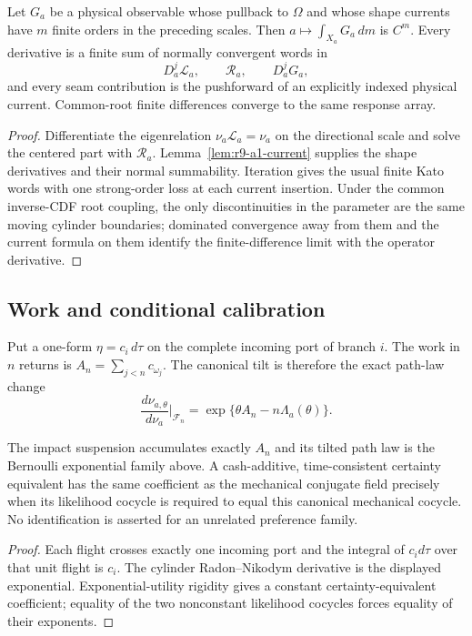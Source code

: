 \begin{theorem}
\label{thm:r9-a1-response}
Let $G_a$ be a physical observable whose pullback to $\Omega$ and whose shape
currents have $m$ finite orders in the preceding scales.  Then
$a\mapsto\int_{X_a}G_a\,dm$ is $C^m$.  Every derivative is a finite sum of
normally convergent words in
\[
 D_a^j\mathcal L_a,
 \qquad \mathcal R_a,
 \qquad D_a^jG_a,
\]
and every seam contribution is the pushforward of an explicitly indexed
physical current.  Common-root finite differences converge to the same
response array.
\end{theorem}

\begin{proof}
Differentiate the eigenrelation
$\nu_a\mathcal L_a=\nu_a$ on the directional scale and solve the centered
part with $\mathcal R_a$.  Lemma~\ref{lem:r9-a1-current} supplies the shape
derivatives and their normal summability.  Iteration gives the usual finite
Kato words with one strong-order loss at each current insertion.  Under the
common inverse-CDF root coupling, the only discontinuities in the parameter
are the same moving cylinder boundaries; dominated convergence away from them
and the current formula on them identify the finite-difference limit with the
operator derivative.
\end{proof}

\subsection{Work and conditional calibration}

Put a one-form $\eta=c_i\,d\tau$ on the complete incoming port of branch $i$.
The work in $n$ returns is $A_n=\sum_{j<n}c_{\omega_j}$.  The canonical tilt is
therefore the exact path-law change
\[
 \frac{d\nu_{a,\theta}}{d\nu_a}\Big|_{\mathcal F_n}
 =\exp\{\theta A_n-n\Lambda_a(\theta)\}.
\]

\begin{theorem}
\label{thm:r9-a1-calibration}
The impact suspension accumulates exactly $A_n$ and its tilted path law is the
Bernoulli exponential family above.  A cash-additive, time-consistent
certainty equivalent has the same coefficient as the mechanical conjugate
field precisely when its likelihood cocycle is required to equal this
canonical mechanical cocycle.  No identification is asserted for an
unrelated preference family.
\end{theorem}

\begin{proof}
Each flight crosses exactly one incoming port and the integral of $c_i d\tau$
over that unit flight is $c_i$.  The cylinder Radon--Nikodym derivative is the
displayed exponential.  Exponential-utility rigidity gives a constant
certainty-equivalent coefficient; equality of the two nonconstant likelihood
cocycles forces equality of their exponents.
\end{proof}

